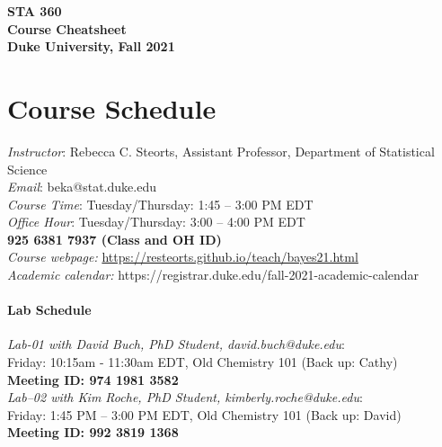 \documentclass[11pt]{article}
\date{}
\begin{document}
\begin{center}
{\Large\bf STA 360\\ Course Cheatsheet} \\

{\Large\bf Duke University, Fall 2021} \\
\end{center}


\section{Course Schedule}
\emph{Instructor}: Rebecca C. Steorts,  Assistant Professor,  Department of Statistical Science\\
\emph{Email}: beka@stat.duke.edu\\
\emph{Course Time}: Tuesday/Thursday: 1:45 -- 3:00 PM EDT \\
\emph{Office Hour}: Tuesday/Thursday: 3:00 -- 4:00 PM EDT \\
\textbf{925 6381 7937 (Class and OH ID)}\\
\emph{Course webpage:} \url{https://resteorts.github.io/teach/bayes21.html} \\
\emph{Academic calendar:} https://registrar.duke.edu/fall-2021-academic-calendar


\paragraph{Lab Schedule}
\emph{Lab-01 with David Buch, PhD Student, david.buch@duke.edu}: \\Friday: 10:15am - 11:30am EDT, Old Chemistry 101 (Back up: Cathy) \\
\textbf{Meeting ID: 974 1981 3582}\\
\emph{Lab--02 with Kim Roche, PhD Student, kimberly.roche@duke.edu}: \\Friday: 1:45 PM -- 3:00 PM EDT, Old Chemistry 101 (Back up: David) \\
\textbf{Meeting ID: 992 3819 1368}
\end{document}
